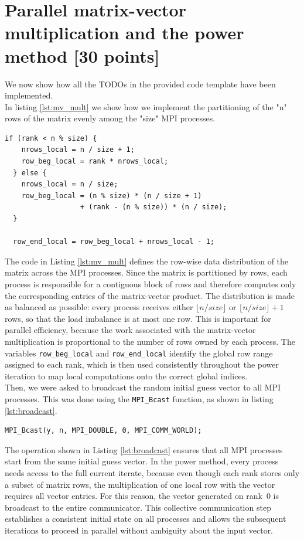 \documentclass[unicode,10pt,a4paper,oneside,numbers=endperiod,openany]{scrartcl}
\begin{document}
\section{Parallel matrix-vector multiplication and the power method
         [30 points]}

We now show how all the TODOs in the provided code template have been implemented.\\
In listing \ref{lst:mv_mult} we show how we implement the partitioning of the "n" rows of the matrix evenly among the "size" MPI processes.
\begin{lstlisting}[style=grayverbatim, caption={Partitioning of the matrix rows among MPI processes}, label={lst:mv_mult}]
if (rank < n % size) {
    nrows_local = n / size + 1;
    row_beg_local = rank * nrows_local;
  } else {
    nrows_local = n / size;
    row_beg_local = (n % size) * (n / size + 1)
                  + (rank - (n % size)) * (n / size);
  }

  row_end_local = row_beg_local + nrows_local - 1;
\end{lstlisting}

The code in Listing \ref{lst:mv_mult} defines the row-wise data distribution of the matrix across the MPI processes. Since the matrix is partitioned by rows, each process is responsible for a contiguous block of rows and therefore computes only the corresponding entries of the matrix-vector product. The distribution is made as balanced as possible: every process receives either $\lfloor n/size \rfloor$ or $\lfloor n/size \rfloor + 1$ rows, so that the load imbalance is at most one row. This is important for parallel efficiency, because the work associated with the matrix-vector multiplication is proportional to the number of rows owned by each process. The variables \texttt{row\_beg\_local} and \texttt{row\_end\_local} identify the global row range assigned to each rank, which is then used consistently throughout the power iteration to map local computations onto the correct global indices.\\

Then, we were asked to broadcast the random initial guess vector to all MPI processes. This was done using the \texttt{MPI\_Bcast} function, as shown in listing \ref{lst:broadcast}.
\begin{lstlisting}[style=grayverbatim, caption={Broadcasting the initial guess vector to all MPI processes}, label={lst:broadcast}]
MPI_Bcast(y, n, MPI_DOUBLE, 0, MPI_COMM_WORLD);
\end{lstlisting}
The operation shown in Listing \ref{lst:broadcast} ensures that all MPI processes start from the same initial guess vector. In the power method, every process needs access to the full current iterate, because even though each rank stores only a subset of matrix rows, the multiplication of one local row with the vector requires all vector entries. For this reason, the vector generated on rank~0 is broadcast to the entire communicator. This collective communication step establishes a consistent initial state on all processes and allows the subsequent iterations to proceed in parallel without ambiguity about the input vector.
\end{document}
